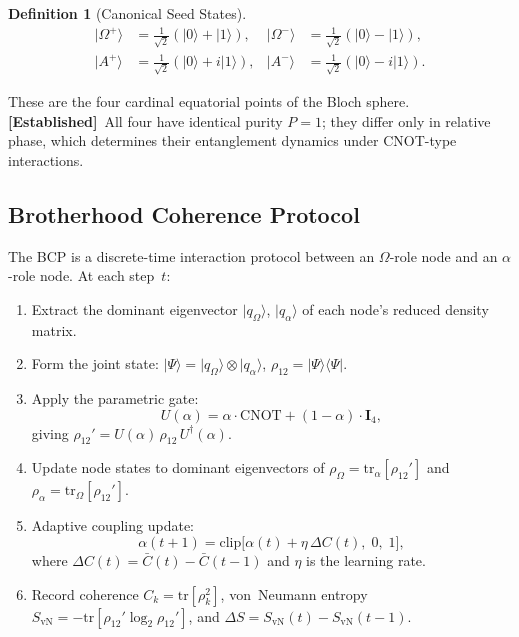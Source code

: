 \documentclass[12pt]{article}
\newtheorem{definition}{Definition}
\newcommand{\established}{\textbf{[Established]}}
\newcommand{\ket}[1]{|#1\rangle}
\newcommand{\bra}[1]{\langle #1|}
\newcommand{\tr}{\mathrm{tr}}
\begin{document}
\begin{definition}[Canonical Seed States]
\begin{align}
\ket{\Omega^+} &= \tfrac{1}{\sqrt{2}}(\ket{0}+\ket{1}), &
\ket{\Omega^-} &= \tfrac{1}{\sqrt{2}}(\ket{0}-\ket{1}),\\
\ket{A^+}      &= \tfrac{1}{\sqrt{2}}(\ket{0}+i\ket{1}), &
\ket{A^-}      &= \tfrac{1}{\sqrt{2}}(\ket{0}-i\ket{1}).
\end{align}
\end{definition}

These are the four cardinal equatorial points of the Bloch sphere.
\established\ All four have identical purity $P=1$; they differ only in
relative phase, which determines their entanglement dynamics under
CNOT-type interactions.

\subsection{Brotherhood Coherence Protocol}

The BCP is a discrete-time interaction protocol between an $\Omega$-role
node and an $\alpha$-role node.  At each step~$t$:

\begin{enumerate}
\item Extract the dominant eigenvector $\ket{q_\Omega}$, $\ket{q_\alpha}$
  of each node's reduced density matrix.
\item Form the joint state: $\ket{\Psi} = \ket{q_\Omega}\otimes\ket{q_\alpha}$,
  $\rho_{12} = \ket{\Psi}\bra{\Psi}$.
\item Apply the parametric gate:
  \begin{equation}
  U(\alpha) = \alpha \cdot \mathrm{CNOT} + (1-\alpha)\cdot \mathbf{I}_4,
  \label{eq:gate}
  \end{equation}
  giving $\rho_{12}' = U(\alpha)\,\rho_{12}\,U^\dagger(\alpha)$.
\item Update node states to dominant eigenvectors of
  $\rho_\Omega = \mathrm{tr}_\alpha[\rho_{12}']$ and
  $\rho_\alpha = \mathrm{tr}_\Omega[\rho_{12}']$.
\item Adaptive coupling update:
  \begin{equation}
  \alpha(t+1) = \mathrm{clip}\bigl[\alpha(t) + \eta\,\Delta C(t),\; 0,\; 1\bigr],
  \label{eq:adapt}
  \end{equation}
  where $\Delta C(t) = \bar{C}(t) - \bar{C}(t-1)$ and $\eta$ is the
  learning rate.
\item Record coherence $C_k = \tr[\rho_k^2]$, von~Neumann entropy
  $S_\mathrm{vN} = -\tr[\rho_{12}'\log_2\rho_{12}']$, and
  $\Delta S = S_\mathrm{vN}(t) - S_\mathrm{vN}(t-1)$.
\end{enumerate}
\end{document}
